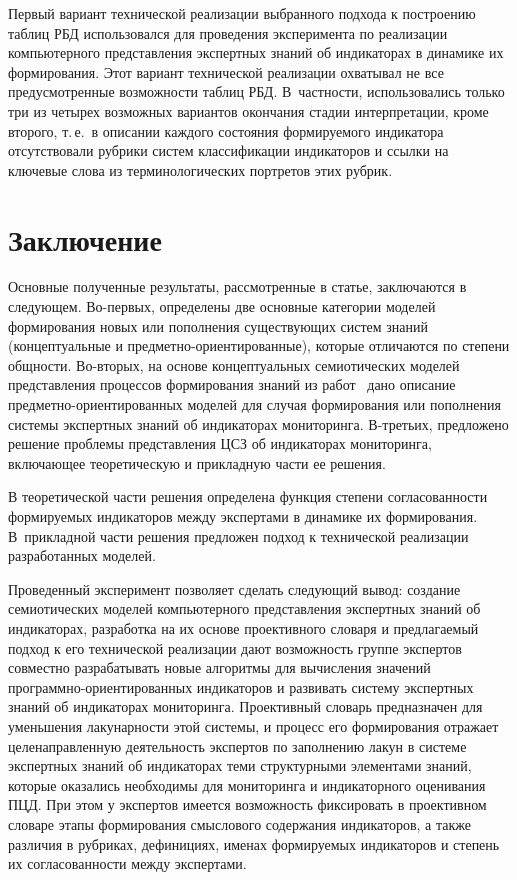 \begin{multicols}{2}
   Первый вариант технической реализации выбранного подхода к построению таблиц РБД 
использовался для проведения эксперимента по реализа\-ции компьютерного представления 
экспертных знаний об индикаторах в динамике их формирования. Этот вариант технической 
реализации охватывал не все предусмотренные возможности таблиц РБД. В~частности, 
использовались только три из четырех возможных вариантов окончания стадии 
интерпретации, кроме второго, т.\,е.\ в описании каждого состояния формируемого 
индикатора отсутствовали рубрики систем классификации индикаторов и ссылки на 
ключевые слова из терминологических портретов этих рубрик.

\section{Заключение}

   Основные полученные результаты, рассмотренные в статье, заключаются в следующем. 
Во-пер\-вых, определены две основные категории моделей\linebreak
формирования новых или 
пополнения существу\-ющих систем знаний (концептуальные и пред\-мет\-но-ори\-ен\-ти\-ро\-ван\-ные), 
которые отличаются по\linebreak
степени общности. Во-вторых, на основе концептуальных 
семиотических моделей представления процессов формирования знаний из 
   работ~\cite{16-zat, 17-zat} дано описание предметно-ориентированных моделей для 
случая формирования или пополнения системы экспертных знаний об индикаторах 
мониторинга. В-третьих, предложено решение проблемы представления ЦСЗ об индикаторах 
мониторинга, включающее теоретическую и прикладную части ее решения.
   
   В теоретической части решения определена функция степени согласованности 
формируемых индикаторов между экспертами в динамике их формирования. В~прикладной 
части решения предложен подход к технической реализации разработанных моделей.
   
   Проведенный эксперимент позволяет сделать следующий вывод: создание семиотических 
моделей компьютерного представления экспертных знаний об индикаторах, разработка на их 
основе проективного словаря и предлагаемый подход к его технической реализации дают 
возможность группе экспертов совместно разрабатывать новые алгоритмы для вычисления 
значений прог\-рам\-мно-ори\-ен\-ти\-ро\-ван\-ных индикаторов и развивать систему экспертных 
знаний об индикаторах мониторинга. Проективный словарь предназначен для уменьшения 
лакунарности этой системы, и процесс его формирования отражает целенаправленную 
деятельность экспертов по заполнению лакун в системе экспертных знаний об индикаторах 
теми структурными элементами знаний, которые оказались необходимы для мониторинга и 
индикаторного оценивания ПЦД. При этом у экспертов имеется возможность фиксировать в 
проективном словаре этапы формирования смыслового содержания индикаторов, а также 
различия в рубриках, дефинициях, именах формируемых индикаторов и степень их 
согласованности между экспертами.


\end{multicols}
